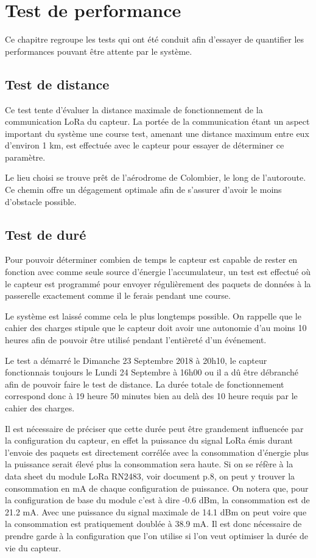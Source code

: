 
\chapter{Test de performance}

Ce chapitre regroupe les tests qui ont été conduit afin d'essayer de quantifier les performances pouvant être attente par le système.

\section{Test de distance}

Ce test tente d'évaluer la distance maximale de fonctionnement de la communication LoRa du capteur. La portée de la communication étant un aspect important du système une course test, amenant une distance maximum entre eux d'environ 1 km, est effectuée avec le capteur pour essayer de déterminer ce paramètre.

Le lieu choisi se trouve prêt de l'aérodrome de Colombier, le long de l'autoroute. Ce chemin offre un dégagement optimale afin de s'assurer d'avoir le moins d'obstacle possible.

\todo{}

\section{Test de duré}

Pour pouvoir déterminer combien de temps le capteur est capable de rester en fonction avec comme seule source d'énergie l'accumulateur, un test est effectué  où le capteur est programmé pour envoyer régulièrement des paquets de données à la passerelle exactement comme il le ferais pendant une course.

Le système est laissé comme cela le plus longtemps possible. On rappelle que le cahier des charges stipule que le capteur doit avoir une autonomie d'au moins 10 heures afin de pouvoir être utilisé pendant l'entièreté d'un événement.

Le test a démarré le Dimanche 23 Septembre 2018 à 20h10, le capteur fonctionnais toujours le Lundi 24 Septembre à 16h00 ou il a dû être débranché afin de pouvoir faire le test de distance. La durée totale de fonctionnement correspond donc à 19 heure 50 minutes bien au delà des 10 heure requis par le cahier des charges.

Il est nécessaire de préciser que cette durée peut être grandement influencée par la configuration du capteur, en effet la puissance du signal LoRa émis durant l'envoie des paquets est directement corrélée avec la consommation d'énergie plus la puissance serait élevé plus la consommation sera haute. Si on se réfère à la data sheet du module LoRa RN2483, voir document \cite{rn2483-datasheet-real} p.8, on peut y trouver la consommation en mA de chaque configuration de puissance. On notera que, pour la configuration de base du module c'est à dire -0.6 dBm, la consommation est de 21.2 mA. Avec une puissance du signal maximale de 14.1 dBm on peut voire que la consommation est pratiquement doublée à 38.9 mA. Il est donc nécessaire de prendre garde à la configuration que l'on utilise si l'on veut optimiser la durée de vie du capteur.